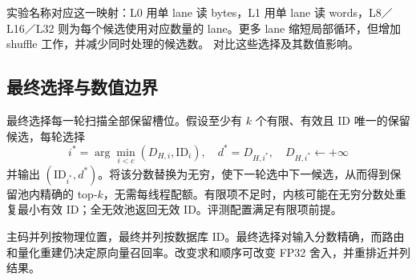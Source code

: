 实验名称对应这一映射：L0 用单 lane 读 bytes，L1 用单 lane 读 words，L8／L16／L32 则为每个候选使用对应数量的 lane。更多 lane 缩短局部循环，但增加 shuffle 工作，并减少同时处理的候选数。 对比这些选择及其数值影响。

\subsection{最终选择与数值边界}

最终选择每一轮扫描全部保留槽位。假设至少有 $k$ 个有限、有效且 ID 唯一的保留候选，每轮选择
\[
 i^*=\arg\min_{i<c}(D_{H,i},\mathrm{ID}_i),\quad d^*=D_{H,i^*},\quad
 D_{H,i^*}\leftarrow+\infty
\]
并输出 $(\mathrm{ID}_{i^*},d^*)$。将该分数替换为无穷，使下一轮选中下一候选，从而得到保留池内精确的 top-$k$，无需每线程配额。有限项不足时，内核可能在无穷分数处重复最小有效 ID；全无效池返回无效 ID。评测配置满足有限项前提。

主码并列按物理位置，最终并列按数据库 ID。最终选择对输入分数精确，而路由和量化重建仍决定原向量召回率。改变求和顺序可改变 FP32 舍入，并重排近并列结果。
